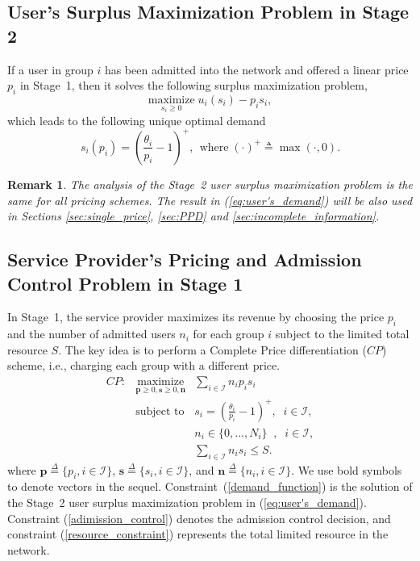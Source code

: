 \documentclass[twocolumn,10pt,twosided]{IEEEtran}
\newtheorem{remark}{Remark}
\begin{document}
\subsection{User's Surplus Maximization Problem in Stage 2}
If a user in group $i$ has been admitted into the network and offered a linear price $p_i$ in Stage~1, then it solves the following surplus maximization problem,
\begin{equation}
\label{eq:user's_problem}
    \underset{s_{i}\ge 0}{\text{maximize}}\; u_{i}(s_{i})-p_{i} s_{i},
\end{equation}
which leads to the following unique optimal demand
\begin{equation}
    s_i(p_{i}) =\left(\frac{\theta_i }{p_i} - 1\right)^+,\,\;\text{where}\;(\cdot)^+ \triangleq \max(\cdot,0).
\label{eq:user's_demand}
\end{equation}
\begin{remark}
The analysis of the Stage~2 user surplus maximization problem is the same for all pricing schemes. The result in (\ref{eq:user's_demand}) will be also used in Sections \ref{sec:single_price}, \ref{sec:PPD} and \ref{sec:incomplete_information}.
\end{remark}

\subsection{Service Provider's Pricing and Admission Control Problem in Stage 1}
\label{sec:sp_cpd}
In Stage~1, the service provider maximizes its revenue by choosing  the price $p_i$ and the  number of admitted users $n_i$ for each group $i$ subject to the limited total resource $S$. The key idea is to perform a Complete Price differentiation ($CP$) scheme, i.e., charging each group with a different price.
\begin{eqnarray}
    CP:& \underset{\boldsymbol{p}\geq 0, \boldsymbol{s}\geq 0,\boldsymbol{n}}{\text{maximize}} & \sum\limits_{i\in\mathcal{I}} n_i p_{i} s_{i} \label{eq:cp_obj}\\
    &\text{subject to}& s_i =\left(\frac{\theta_i }{p_i} - 1\right)^+,\;\; i\in\mathcal{I}, \label{demand_function}\\
    && n_i \in\{0,\ldots,N_{i}\} \;\;,\;\;  i\in\mathcal{I}, \label{adimission_control}\\
    &&\sum\limits_{i\in\mathcal{I}} n_i s_{i} \le S. \label{resource_constraint}
\end{eqnarray}
where $\boldsymbol{p}\overset{\Delta}{=}\{p_i, i\in\mathcal{I}\}$, $\boldsymbol{s}\overset{\Delta}{=}\{s_i, i\in\mathcal{I}\}$, and $\boldsymbol{n}\overset{\Delta}{=}\{n_i, i\in\mathcal{I}\}$. We use bold symbols to
denote vectors in the sequel. Constraint~(\ref{demand_function}) is the solution of the Stage~2 user surplus maximization problem in (\ref{eq:user's_demand}). Constraint
(\ref{adimission_control}) denotes the admission control decision, and
constraint (\ref{resource_constraint}) represents the total limited
resource in the network.
\end{document}
